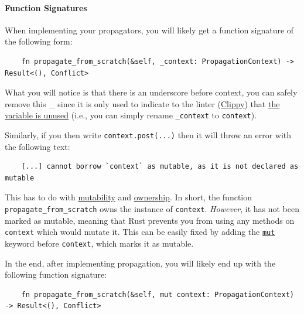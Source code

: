 \documentclass{article}
\begin{document}
    \paragraph*{Function Signatures}
        When implementing your propagators, you will likely get a function signature of the following form:
        \begin{verbatim}
    fn propagate_from_scratch(&self, _context: PropagationContext) -> Result<(), Conflict>
        \end{verbatim}
        What you will notice is that there is an underscore before context, you can safely remove this \_ since it is only used to indicate to the linter (\href{https://doc.rust-lang.org/clippy/}{Clippy}) that \href{https://rust-lang.github.io/rust-clippy/master/index.html#used_underscore_binding}{the variable is unused} (i.e., you can simply rename \texttt{_context} to \texttt{context}).

        Similarly, if you then write \texttt{context.post(...)} then it will throw an error with the following text:
        \begin{verbatim}
    [...] cannot borrow `context` as mutable, as it is not declared as mutable
        \end{verbatim}
        This has to do with \href{https://doc.rust-lang.org/book/ch03-01-variables-and-mutability.html}{mutability} and \href{https://doc.rust-lang.org/book/ch04-01-what-is-ownership.html}{ownership}.
        In short, the function \texttt{propagate_from_scratch} owns the instance of \texttt{context}.
        \textit{However}, it has not been marked as mutable, meaning that Rust prevents you from using any methods on \texttt{context} which would mutate it.
        This can be easily fixed by adding the \href{https://doc.rust-lang.org/book/appendix-01-keywords.html?highlight=mut#keywords-currently-in-use}{\texttt{mut}} keyword before \texttt{context}, which marks it as mutable.

        In the end, after implementing propagation, you will likely end up with the following function signature:
        \begin{verbatim}
    fn propagate_from_scratch(&self, mut context: PropagationContext) -> Result<(), Conflict>
        \end{verbatim}
\end{document}
